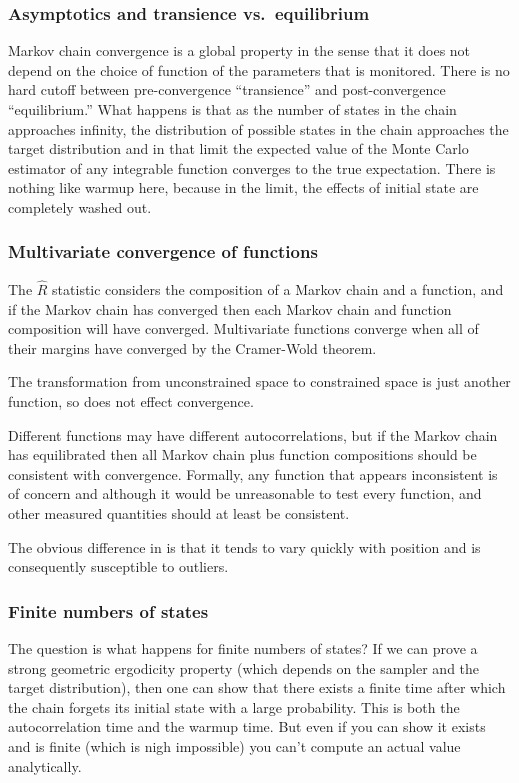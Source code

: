 \subsubsection{Asymptotics and transience vs.\ equilibrium}

Markov chain convergence is a global property in the sense that it
does not depend on the choice of function of the parameters that is
monitored.  There is no hard cutoff between pre-convergence
``transience'' and post-convergence ``equilibrium.''  What happens is
that as the number of states in the chain approaches infinity, the
distribution of possible states in the chain approaches the target
distribution and in that limit the expected value of the Monte Carlo
estimator of any integrable function converges to the true
expectation. There is nothing like warmup here, because in the limit,
the effects of initial state are completely washed out.

\subsubsection{Multivariate convergence of functions}

The $\hat{R}$ statistic considers the composition of a Markov chain
and a function, and if the Markov chain has converged then each Markov
chain and function composition will have converged. Multivariate
functions converge when all of their margins have converged by the
Cramer-Wold theorem.

The transformation from unconstrained space to constrained space is
just another function, so does not effect convergence.

Different functions may have different autocorrelations, but if the
Markov chain has equilibrated then all Markov chain plus function
compositions should be consistent with convergence. Formally, any
function that appears inconsistent is of concern and although it would
be unreasonable to test every function,  and other
measured quantities should at least be consistent.

The obvious difference in  is that it tends to vary
quickly with position and is consequently susceptible to outliers.

\subsubsection{Finite numbers of states}

The question is what happens for finite numbers of states? If we can
prove a strong geometric ergodicity property (which depends on the
sampler and the target distribution), then one can show that there
exists a finite time after which the chain forgets its initial state
with a large probability. This is both the autocorrelation time and
the warmup time.  But even if you can show it exists and is finite
(which is nigh impossible) you can't compute an actual value
analytically.


